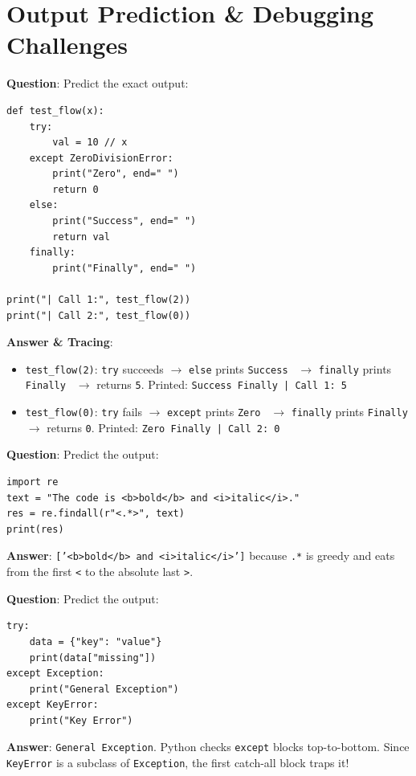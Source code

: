\section{Output Prediction \& Debugging Challenges}

\begin{outputprediction}
\textbf{Question}: Predict the exact output:
\begin{lstlisting}[language=Python3]
def test_flow(x):
    try:
        val = 10 // x
    except ZeroDivisionError:
        print("Zero", end=" ")
        return 0
    else:
        print("Success", end=" ")
        return val
    finally:
        print("Finally", end=" ")

print("| Call 1:", test_flow(2))
print("| Call 2:", test_flow(0))
\end{lstlisting}
\textbf{Answer \& Tracing}:
\begin{itemize}
    \item \texttt{test\_flow(2)}: \texttt{try} succeeds $\to$ \texttt{else} prints \texttt{Success } $\to$ \texttt{finally} prints \texttt{Finally } $\to$ returns \texttt{5}. Printed: \texttt{Success Finally | Call 1: 5}
    \item \texttt{test\_flow(0)}: \texttt{try} fails $\to$ \texttt{except} prints \texttt{Zero } $\to$ \texttt{finally} prints \texttt{Finally } $\to$ returns \texttt{0}. Printed: \texttt{Zero Finally | Call 2: 0}
\end{itemize}
\end{outputprediction}

\begin{outputprediction}
\textbf{Question}: Predict the output:
\begin{lstlisting}[language=Python3]
import re
text = "The code is <b>bold</b> and <i>italic</i>."
res = re.findall(r"<.*>", text)
print(res)
\end{lstlisting}
\textbf{Answer}: \texttt{['<b>bold</b> and <i>italic</i>']} because \texttt{.*} is greedy and eats from the first \texttt{<} to the absolute last \texttt{>}.
\end{outputprediction}

\begin{outputprediction}
\textbf{Question}: Predict the output:
\begin{lstlisting}[language=Python3]
try:
    data = {"key": "value"}
    print(data["missing"])
except Exception:
    print("General Exception")
except KeyError:
    print("Key Error")
\end{lstlisting}
\textbf{Answer}: \texttt{General Exception}. Python checks \texttt{except} blocks top-to-bottom. Since \texttt{KeyError} is a subclass of \texttt{Exception}, the first catch-all block traps it!
\end{outputprediction}

